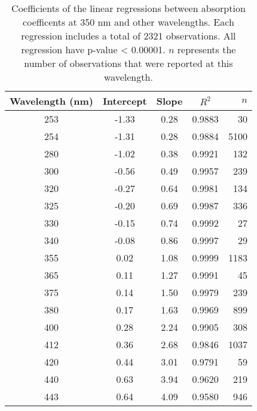 \begin{table}[ht]
\centering
\begin{tabular}{ccccr}
  \hline
Wavelength (nm) & Intercept & Slope & $R^2$ & $n$ \\ 
  \hline
253 & -1.33 & 0.28 & 0.9883 & 30 \\ 
  254 & -1.31 & 0.28 & 0.9884 & 5100 \\ 
  280 & -1.02 & 0.38 & 0.9921 & 132 \\ 
  300 & -0.56 & 0.49 & 0.9957 & 239 \\ 
  320 & -0.27 & 0.64 & 0.9981 & 134 \\ 
  325 & -0.20 & 0.69 & 0.9987 & 336 \\ 
  330 & -0.15 & 0.74 & 0.9992 & 27 \\ 
  340 & -0.08 & 0.86 & 0.9997 & 29 \\ 
  355 & 0.02 & 1.08 & 0.9999 & 1183 \\ 
  365 & 0.11 & 1.27 & 0.9991 & 45 \\ 
  375 & 0.14 & 1.50 & 0.9979 & 239 \\ 
  380 & 0.17 & 1.63 & 0.9969 & 899 \\ 
  400 & 0.28 & 2.24 & 0.9905 & 308 \\ 
  412 & 0.36 & 2.68 & 0.9846 & 1037 \\ 
  420 & 0.44 & 3.01 & 0.9791 & 59 \\ 
  440 & 0.63 & 3.94 & 0.9620 & 219 \\ 
  443 & 0.64 & 4.09 & 0.9580 & 946 \\ 
   \hline
\end{tabular}
\caption{Coefficients of the linear regressions between absorption 
coefficents at 350 nm and other wavelengths. Each regression includes a total 
of 2321 observations. All regression have p-value < 0.00001.  $n$ represents 
the number of observations that were reported at this wavelength.} 
\end{table}
